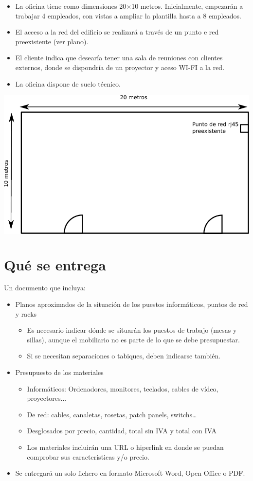 \begin{itemize}
\item La oficina tiene como dimensiones 20$\times$10  metros. Inicialmente, empezarán a trabajar 4 empleados, con vistas a  ampliar la plantilla hasta a 8 empleados.
\item El acceso a la red del edificio se realizará a través de un punto e red preexistente (ver plano).
\item El cliente indica que desearía tener una sala de reuniones con clientes externos, donde se dispondría de un proyector y aceso WI-FI a la red.
\item La oficina dispone de suelo técnico.
\end{itemize}
\begin{center}
  \includegraphics{media/plano-oficina.pdf}
\end{center}

\section{Qué se entrega}
Un documento que incluya:
\begin{itemize}
\item Planos aproximados de la situación de los puestos informáticos, puntos de red y racks
  \begin{itemize}
  \item Es necesario indicar dónde se situarán los puestos de trabajo (mesas y sillas), aunque el mobiliario no es
    parte de lo que se debe presupuestar.
  \item Si se necesitan separaciones o tabiques, deben indicarse también.
\end{itemize}
\item Presupuesto de los materiales
  \begin{itemize}
  \item Informáticos: Ordenadores, monitores, teclados, cables de vídeo, proyectores...
  \item De red: cables, canaletas, rosetas, patch panels, switchs…
  \item Desglosados por precio, cantidad, total sin IVA y total con IVA
  \item Los materiales incluirán una URL o hiperlink en donde se puedan comprobar sus características y/o precio.
\end{itemize}
\item Se entregará un solo fichero en formato Microsoft Word, Open Office o PDF.
\end{itemize}

